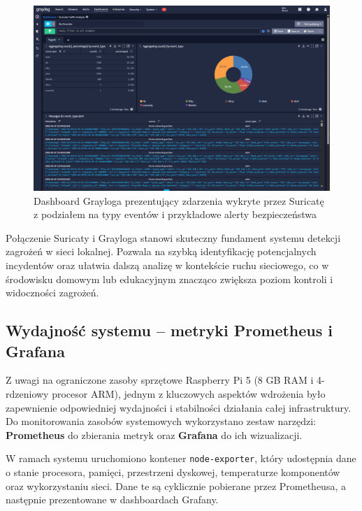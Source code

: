 \documentclass[
    left=2.5cm,         %
    right=2.5cm,        %
    top=2.5cm,          %
    bottom=3cm,         %
    bindingoffset=6mm,  %
    nohyphenation=true %
]{eiti/eiti-thesis} %
\begin{document}
\begin{figure}[H]
    \centering
    \includegraphics[width=\textwidth]{graylog.png}
    \caption{Dashboard Grayloga prezentujący zdarzenia wykryte przez Suricatę z podziałem na typy eventów i przykładowe alerty bezpieczeństwa}
    \label{fig:graylog-suricata-dashboard}
\end{figure}

Połączenie Suricaty i Grayloga stanowi skuteczny fundament systemu detekcji zagrożeń w sieci lokalnej. Pozwala na szybką identyfikację potencjalnych incydentów oraz ułatwia dalszą analizę w kontekście ruchu sieciowego, co w środowisku domowym lub edukacyjnym znacząco zwiększa poziom kontroli i widoczności zagrożeń.

\subsection{Wydajność systemu – metryki Prometheus i Grafana}

Z uwagi na ograniczone zasoby sprzętowe Raspberry Pi 5 (8 GB RAM i 4-rdzeniowy procesor ARM), jednym z kluczowych aspektów wdrożenia było zapewnienie odpowiedniej wydajności i stabilności działania całej infrastruktury. Do monitorowania zasobów systemowych wykorzystano zestaw narzędzi: \textbf{Prometheus} do zbierania metryk oraz \textbf{Grafana} do ich wizualizacji.

W ramach systemu uruchomiono kontener \texttt{node-exporter}, który udostępnia dane o stanie procesora, pamięci, przestrzeni dyskowej, temperaturze komponentów oraz wykorzystaniu sieci. Dane te są cyklicznie pobierane przez Prometheusa, a następnie prezentowane w dashboardach Grafany.
\end{document}
